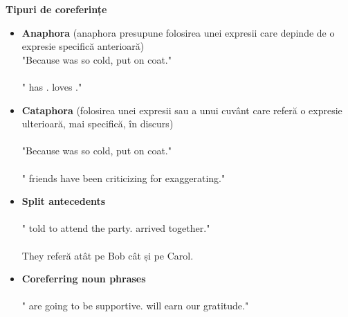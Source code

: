 \documentclass[letterpaper,12pt, dvipsnames, dateno]{article}
\begin{document}
\textbf{Tipuri de coreferințe}
\begin{itemize}
    \item{\textbf{Anaphora} (anaphora presupune folosirea unei expresii care depinde de o expresie specifică anterioară) \\
    "Because  was so cold,  put on  coat." \\ \\
    " has .  loves ." 
    }
    \item{\textbf{Cataphora} (folosirea unei expresii sau a unui cuvânt care referă o expresie ulterioară, mai specifică, în discurs) \\ \\
    "Because  was so cold,  put on  coat." \\ \\
    " friends have been criticizing  for exaggerating."
    }
    \item{\textbf{Split antecedents}\\ \\
    " told  to attend the party.  arrived together." \\ \\
     They referă atât pe Bob cât și pe Carol.
    }
    \item{\textbf{Coreferring noun phrases} \\ \\
    " are going to be supportive.  will earn our gratitude."}
\end{itemize}
    
\end{document}
